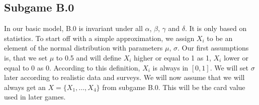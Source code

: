 \subsection{Subgame B.0}
In our basic model, B.0 is invariant under all $\alpha$, $\beta$, $\gamma$ and $\delta$. It is only based on statistics. 
To start off with a simple approximation, we assign $X_i$ to be an element of the normal distribution with parameters $\mu$, $\sigma$.
Our first assumptions is, that we set $\mu$ to 0.5 and will define $X_i$ higher or equal to 1 as 1,  $X_i$ lower or equal to 0 as 0.   
According to this definition, $X_i$ is always in $[0,1]$. We will set $\sigma$ later according to realistic data and surveys. We will now assume that we will always get an $X = \{X_1, …, X_4\}$ from subgame B.0. This will be the card value used in later games. 

